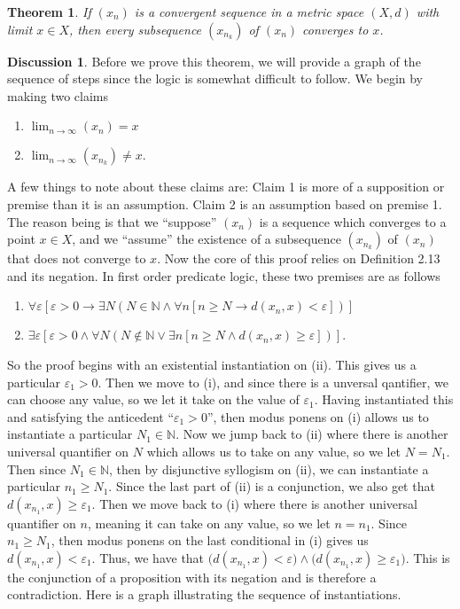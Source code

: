 \documentclass{article}
\newtheorem{theorem}{Theorem}[section]
\theoremstyle{definition}
\theoremstyle{remark}
\theoremstyle{definition}
\newtheorem*{discussion}{Discussion}
\begin{document}
\begin{theorem}
    If $(x_n)$ is a convergent sequence in a metric space $(X,d)$ with limit $x\in X$, then every subsequence $(x_{n_k})$ of $(x_n)$ converges to $x$.
\end{theorem}

\begin{discussion}
    Before we prove this theorem, we will provide a graph of the sequence of steps since the logic is somewhat difficult to follow. We begin by making two claims
    
    \begin{enumerate}
        \item$\displaystyle\lim_{n\rightarrow\infty} (x_n)=x$
        \item $\displaystyle\lim_{n\rightarrow\infty}(x_{n_k})\neq x$.
    \end{enumerate}
    
    \noindent A few things to note about these claims are: Claim 1 is more of a supposition or premise than it is an assumption. Claim 2 is an assumption based on premise 1. The reason being is that we ``suppose'' $(x_n)$ is a sequence which converges to a point $x\in X$, and we ``assume'' the existence of a subsequence $(x_{n_k})$ of $(x_n)$ that does not converge to $x$. Now the core of this proof relies on Definition 2.13 and its negation. In first order predicate logic, these two premises are as follows
    
    \begin{enumerate}[label=\roman*)]
        \item $\forall\varepsilon[\varepsilon>0\rightarrow\exists N(N\in\mathbb{N}\wedge\forall n[n\geq N\rightarrow d(x_n,x)<\varepsilon])]$
        \item $\exists\varepsilon[\varepsilon>0\wedge\forall N(N\notin\mathbb{N}\vee\exists n[n\geq N\wedge d(x_n,x)\geq\varepsilon])]$.
    \end{enumerate}
    
    \noindent So the proof begins with an existential instantiation on (ii). This gives us a particular $\varepsilon_1>0$. Then we move to (i), and since there is a unversal qantifier, we can choose any value, so we let it take on the value of $\varepsilon_1$. Having instantiated this and satisfying the anticedent ``$\varepsilon_1>0$'', then modus ponens on (i) allows us to instantiate a particular $N_1\in\mathbb{N}$. Now we jump back to (ii) where there is another universal quantifier on $N$ which allows us to take on any value, so we let $N=N_1$. Then since $N_1\in\mathbb{N}$, then by disjunctive syllogism on (ii), we can instantiate a particular $n_1\geq N_1$. Since the last part of (ii) is a conjunction, we also get that $d(x_{n_1},x)\geq\varepsilon_1$. Then we move back to (i) where there is another universal quantifier on $n$, meaning it can take on any value, so we let $n=n_1$. Since $n_1\geq N_1$, then modus ponens on the last conditional in (i) gives us $d(x_{n_1},x)<\varepsilon_1$. Thus, we have that $\big(d(x_{n_1},x)<\varepsilon\big)\wedge\big(d(x_{n_1},x)\geq \varepsilon_1\big)$. This is the conjunction of a proposition with its negation and is therefore a contradiction. Here is a graph illustrating the sequence of instantiations.
    

\end{discussion}
\end{document}
